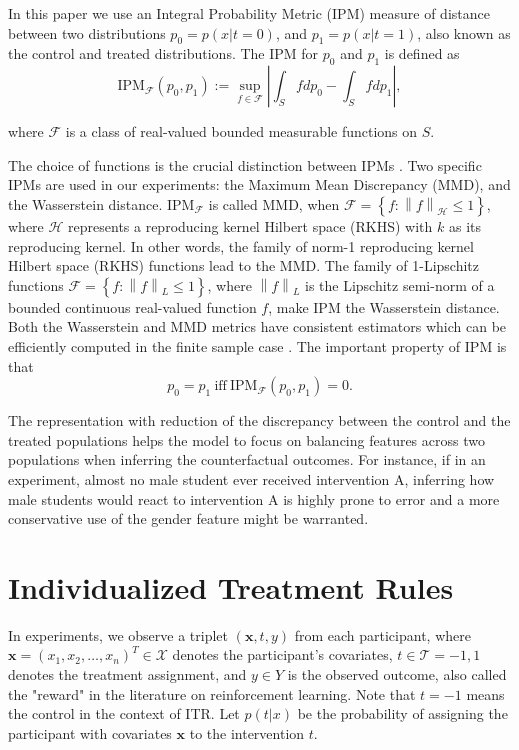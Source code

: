 \documentclass{article}
\begin{document}
In this paper we use an Integral Probability Metric (IPM) measure of distance between two distributions $p_0 = p(x|t = 0)$, and $p_1 = p(x|t = 1)$, also known as the control and treated distributions. The IPM for $p_0$ and $p_1$ is defined as
$$\mathrm{IPM}_{\mathcal{F}}(p_0, p_1) := \sup_{f\in \mathcal{F}} \left |\int_S f dp_0 -\int_S f d p_1 \right |,$$

where $\mathcal{F}$ is a class of real-valued bounded measurable functions on $S$. 

The choice of functions is the crucial distinction between IPMs \cite{Sriperumbudur2009-pf}. Two specific IPMs are used in our experiments: the Maximum Mean Discrepancy (MMD), and the Wasserstein distance. $\mathrm{IPM}_{\mathcal{F}}$ is called MMD, when $\mathcal{F} = \left \{ f : \left \| f \right \| _\mathcal{H}\leq 1\right \}$, where $\mathcal{H}$ represents a reproducing kernel Hilbert space (RKHS) with $k$ as its reproducing kernel. In other words, the family of norm-1 reproducing kernel Hilbert space (RKHS) functions lead to the MMD. The family of 1-Lipschitz functions $\mathcal{F} = \left \{ f:\left \| f\right \|_L \leq 1 \right \}$, where $\left \| f\right \|_L$ is the Lipschitz semi-norm of a bounded continuous real-valued function $f$, make IPM the Wasserstein distance. Both the Wasserstein and MMD metrics have consistent estimators which can be efficiently computed in the finite sample case \cite{Sriperumbudur2012-sz}. The important property of IPM is that $$p_0 = p_1~\mathrm{iff}~ \mathrm{IPM}_{\mathcal{F}}(p_0, p_1) = 0.$$

The representation with reduction of the discrepancy between the control and the treated populations helps the model to focus on balancing features across two populations when inferring the counterfactual outcomes. For instance, if in an experiment, almost no male student ever received intervention A, inferring how male students would react to intervention A is highly prone to error and a more conservative use of the gender feature might be warranted.

\section{Individualized Treatment Rules}
In experiments, we observe a triplet $(\mathbf{x}, t, y)$ from each
participant, where $\mathbf{x}=(x_1, x_2, \ldots, x_n)^T \in
\mathcal{X}$ denotes the participant's covariates, $t \in \mathcal{T}
= {-1,1}$ denotes the treatment assignment, and $y \in Y$ is the
observed outcome, also called the "reward" in the literature on
reinforcement learning. Note that $t=-1$ means the control in the
context of ITR. Let $p(t|x)$ be the probability of assigning the participant
with covariates $\mathbf{x}$ to the intervention $t$.
\end{document}
